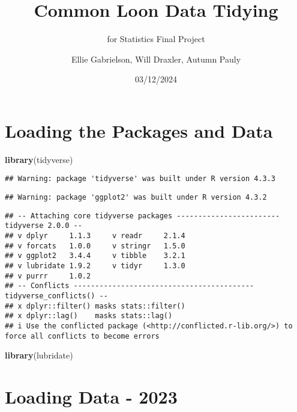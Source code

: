 \documentclass[
]{article}
\title{Common Loon Data Tidying}
\subtitle{for Statistics Final Project}
\author{Ellie Gabrielson, Will Draxler, Autumn Pauly}
\date{03/12/2024}
\newenvironment{Shaded}{\begin{snugshade}}{\end{snugshade}}
\newcommand{\FunctionTok}[1]{\textcolor[rgb]{0.13,0.29,0.53}{\textbf{#1}}}
\newcommand{\NormalTok}[1]{#1}
\begin{document}
\maketitle

\hypertarget{section}{%
\section{}\label{section}}

\hypertarget{loading-the-packages-and-data}{%
\section{Loading the Packages and
Data}\label{loading-the-packages-and-data}}

\begin{Shaded}
\begin{Highlighting}[]
\FunctionTok{library}\NormalTok{(tidyverse)}
\end{Highlighting}
\end{Shaded}

\begin{verbatim}
## Warning: package 'tidyverse' was built under R version 4.3.3
\end{verbatim}

\begin{verbatim}
## Warning: package 'ggplot2' was built under R version 4.3.2
\end{verbatim}

\begin{verbatim}
## -- Attaching core tidyverse packages ------------------------ tidyverse 2.0.0 --
## v dplyr     1.1.3     v readr     2.1.4
## v forcats   1.0.0     v stringr   1.5.0
## v ggplot2   3.4.4     v tibble    3.2.1
## v lubridate 1.9.2     v tidyr     1.3.0
## v purrr     1.0.2     
## -- Conflicts ------------------------------------------ tidyverse_conflicts() --
## x dplyr::filter() masks stats::filter()
## x dplyr::lag()    masks stats::lag()
## i Use the conflicted package (<http://conflicted.r-lib.org/>) to force all conflicts to become errors
\end{verbatim}

\begin{Shaded}
\begin{Highlighting}[]
\FunctionTok{library}\NormalTok{(lubridate)}
\end{Highlighting}
\end{Shaded}

\hypertarget{loading-data---2023}{%
\section{Loading Data - 2023}\label{loading-data---2023}}
\end{document}
